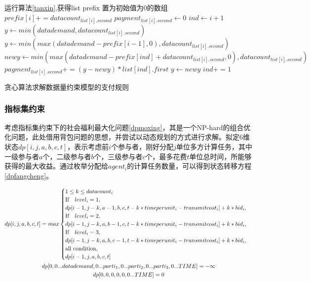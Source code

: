 \documentclass[promaster]{thesis-uestc}
\begin{document}
\begin{algorithm}[h]
    运行算法\ref{tanxin},获得list\;
    prefix 置为初始值为0的数组\;
    {
        $prefix[i]  += datacount_{list[i].second}$\;
    }
    {
        $payment_{list[i].second} \leftarrow 0$\;
        $ind \leftarrow i + 1$
        {
            $y \leftarrow min(datademand,datacount_{list[i].second})$\;
        }{
        $y \leftarrow min(max(datademand - prefix[i-1],0),datacount_{list[i].second})$\;
        }
        {
            $newy \leftarrow min(max(datademand - prefix[ind]+ datacount_{list[i].second},0),datacount_{list[i].second})$\;
            $payment_{list[i].second} += (y - newy)*list[ind].first$\;
            $y \leftarrow newy$\;
            $ind += 1$\;
        }
    }
\caption{贪心算法求解数据量约束模型的支付规则}
\label{tanxin_zhifu}
\end{algorithm}


\FloatBarrier

\subsubsection{指标集约束}
\label{dptou}

考虑指标集约束下的社会福利最大化问题\ref{dpmoxing}，其是一个NP-hard的组合优化问题，此处借用背包问题的思想，并尝试以动态规划的方式进行求解。拟定6维状态$dp[i,j,a,b,c,t]$，表示考虑前$i$个参与者，刚好分配$j$单位多方计算任务，其中一级参与者$a$个，二级参与者$b$个，三级参与者$c$个，最多花费$t$单位总时间，所能够获得的最大收益。通过枚举分配给$agent_i$的计算任务数量，可以得到状态转移方程\ref{dpfangcheng}。

\begin{gather}
\label{dpfangcheng}  
dp[i,j,a,b,c,t] = max
\begin{cases}
1 \leq k \leq datacount_i \\
\text{If} \quad level_i = 1,\\
dp[i-1,j-k,a-1,b,c,t-k*timeperunit_i-transmitcost_i]+ k*bid_i,\\
\text{If}\quad level_i = 2,\\
dp[i-1,j-k,a,b-1,c,t-k*timeperunit_i-transmitcost_i]+ k*bid_i,\\
\text{If} \quad level_i = 3,\\
dp[i-1,j-k,a,b,c-1,t-k*timeperunit_i-transmitcost_i]+ k*bid_i,\\
\text{all condition},\\
dp[i-1,j,a,b,c,t]
\end{cases}\\
dp[0,0...datademand,0...parti_1,0...parti_2,0...parti_3,0...TIME] =-\infty \notag\\
dp[0,0,0,0,0,0...TIME] = 0 \notag
\end{gather}
\end{document}

